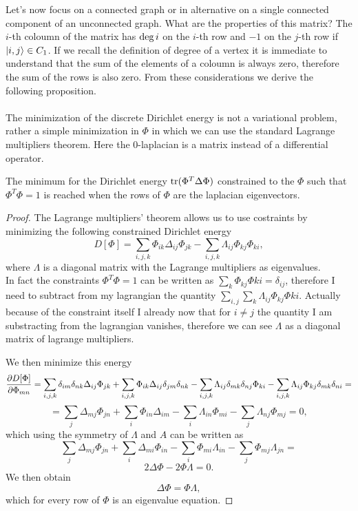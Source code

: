 \documentclass[../2.tex]{subfiles}
\begin{document}
Let's now focus on a connected graph or in alternative on a single connected component of an unconnected graph. What are the properties of this matrix?
The $i$-th coloumn of the matrix has $\operatorname{deg}{i}$ on the $i$-th row and $-1$ on the $j$-th row if $| i,j \rangle \in C_1$. If we recall the definition of degree of a vertex
it is immediate to understand that the sum of the elements of a coloumn is always zero, therefore the sum of the rows is also zero. From these considerations
we derive the following proposition.\\
\hfill \\

The minimization of the discrete Dirichlet energy is not a variational problem, rather a simple minimization in $\Phi$ in which we can 
use the standard Lagrange multipliers theorem. Here the $0$-laplacian is a matrix instead of a differential operator. 
\begin{prop}
    The minimum for the Dirichlet energy $ \operatorname{tr}(\Phi^T \Delta \Phi)$ constrained to the $\Phi$ such that $\Phi^T \Phi = 1$ is reached when the
    rows of $\Phi$ are the laplacian eigenvectors.
\end{prop}
\begin{proof}
    The Lagrange multipliers' theorem allows us to use costraints by minimizing the following constrained Dirichlet energy
    \[ D[\Phi] = \sum_{i,j,k} \Phi_{ik} \Delta_{ij} \Phi_{jk} - \sum_{i,j,k} \Lambda_{ij} \Phi_{kj} \Phi_{ki}, \]
    where $\Lambda$ is a diagonal matrix with the Lagrange multipliers as eigenvalues.\\
    In fact the constraints $\Phi^T \Phi = 1$ can be written as $\sum_k \Phi_{kj} \Phi{ki} = \delta_{ij}$, therefore I need to subtract from my lagrangian
    the quantity $\sum_{i,j} \sum_k \Lambda_{ij} \Phi_{kj} \Phi{ki}$. Actually because of the constraint itself I already now that for $i \neq j$ the quantity
    I am substracting from the lagrangian vanishes, therefore we can see $\Lambda$ as a diagonal matrix of lagrange multipliers.  

    We then minimize this energy
    \[ \frac{\partial D[\Phi]}{\partial \Phi_{mn}} = \sum_{i,j,k} \delta_{im}\delta_{nk}\Delta_{ij} \Phi_{jk} + \sum_{i,j,k} \Phi_{ik} \Delta_{ij}\delta_{jm}\delta_{nk}
    - \sum_{i,j,k} \Lambda_{ij} \delta_{mk}\delta_{nj}\Phi_{ki} - \sum_{i,j,k} \Lambda_{ij} \Phi_{kj} \delta_{mk}\delta_{ni} =  \]
    \[ = \sum_{j} \Delta_{mj} \Phi_{jn} + \sum_{i} \Phi_{in} \Delta_{im} - \sum_{i} \Lambda_{in} \Phi_{mi} - \sum_{j} \Lambda_{nj} \Phi_{mj} = 0, \]
    which using the symmetry of $\Lambda$ and $A$ can be written as
    \[ \sum_{j} \Delta_{mj} \Phi_{jn} + \sum_{i}  \Delta_{mi} \Phi_{in} - \sum_{i} \Phi_{mi}\Lambda_{in} - \sum_{j} \Phi_{mj} \Lambda_{jn} =  \]
    \[ 2\Delta\Phi - 2\Phi\Lambda = 0. \]
    We then obtain 
    \[ \Delta\Phi = \Phi\Lambda, \]
    which for every row of $\Phi$ is an eigenvalue equation. \qedhere
\end{proof}
\end{document}
